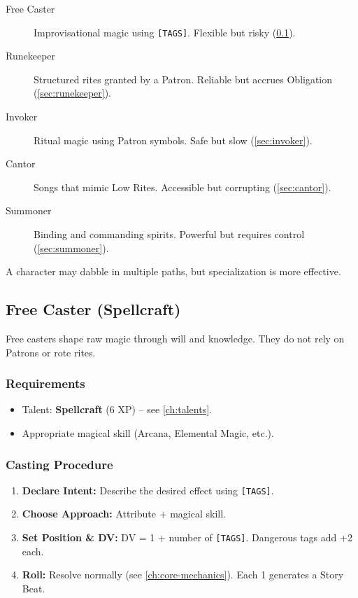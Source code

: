 \begin{description}
  \item[Free Caster] Improvisational magic using \texttt{[TAGS]}. Flexible but risky (\ref{sec:free-caster}).
  \item[Runekeeper] Structured rites granted by a Patron. Reliable but accrues Obligation (\ref{sec:runekeeper}).
  \item[Invoker] Ritual magic using Patron symbols. Safe but slow (\ref{sec:invoker}).
  \item[Cantor] Songs that mimic Low Rites. Accessible but corrupting (\ref{sec:cantor}).
  \item[Summoner] Binding and commanding spirits. Powerful but requires control (\ref{sec:summoner}).
\end{description}

A character may dabble in multiple paths, but specialization is more effective.

\subsection{Free Caster (Spellcraft)}
\label{sec:free-caster}

Free casters shape raw magic through will and knowledge. They do not rely on Patrons or rote rites.

\subsubsection*{Requirements}
\begin{itemize}
  \item Talent: \textbf{Spellcraft} (6 XP) -- see \ref{ch:talents}.
  \item Appropriate magical skill (Arcana, Elemental Magic, etc.).
\end{itemize}

\subsubsection*{Casting Procedure}
\label{sec:free-casting-procedure}
\begin{enumerate}
  \item \textbf{Declare Intent:} Describe the desired effect using \texttt{[TAGS]}.
  \item \textbf{Choose Approach:} Attribute + magical skill.
  \item \textbf{Set Position \& DV:} DV = 1 + number of \texttt{[TAGS]}. Dangerous tags add +2 each.
  \item \textbf{Roll:} Resolve normally (see \ref{ch:core-mechanics}). Each 1 generates a Story Beat.
\end{enumerate}

